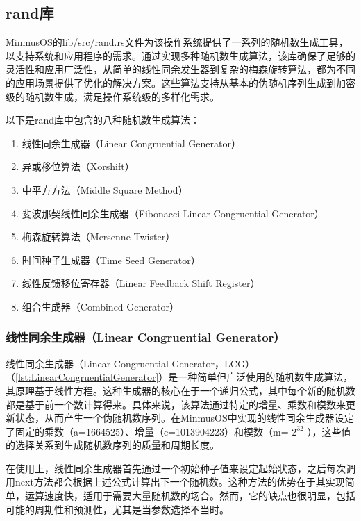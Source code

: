 \subsection{rand库}

MinmusOS的lib/src/rand.rs文件为该操作系统提供了一系列的随机数生成工具，以支持系统和应用程序的需求。通过实现多种随机数生成算法，该库确保了足够的灵活性和应用广泛性，从简单的线性同余发生器到复杂的梅森旋转算法，都为不同的应用场景提供了优化的解决方案。这些算法支持从基本的伪随机序列生成到加密级的随机数生成，满足操作系统级的多样化需求。

以下是rand库中包含的八种随机数生成算法：

\begin{enumerate}
    \item 线性同余生成器（Linear Congruential Generator）
    \item 异或移位算法（Xorshift）
    \item 中平方方法（Middle Square Method）
    \item 斐波那契线性同余生成器（Fibonacci Linear Congruential Generator）
    \item 梅森旋转算法（Mersenne Twister）
    \item 时间种子生成器（Time Seed Generator）
    \item 线性反馈移位寄存器（Linear Feedback Shift Register）
    \item 组合生成器（Combined Generator）
\end{enumerate}

\subsubsection{线性同余生成器（Linear Congruential Generator）}

线性同余生成器（Linear Congruential Generator，LCG）（\cref{lst:LinearCongruentialGenerator}）是一种简单但广泛使用的随机数生成算法，其原理基于线性方程。这种生成器的核心在于一个递归公式，其中每个新的随机数都是基于前一个数计算得来。具体来说，该算法通过特定的增量、乘数和模数来更新状态，从而产生一个伪随机数序列。在MinmusOS中实现的线性同余生成器设定了固定的乘数（a=1664525）、增量（c=1013904223）和模数（m= $2^{32}$ ），这些值的选择关系到生成随机数序列的质量和周期长度。

在使用上，线性同余生成器首先通过一个初始种子值来设定起始状态，之后每次调用next方法都会根据上述公式计算出下一个随机数。这种方法的优势在于其实现简单，运算速度快，适用于需要大量随机数的场合。然而，它的缺点也很明显，包括可能的周期性和预测性，尤其是当参数选择不当时。

